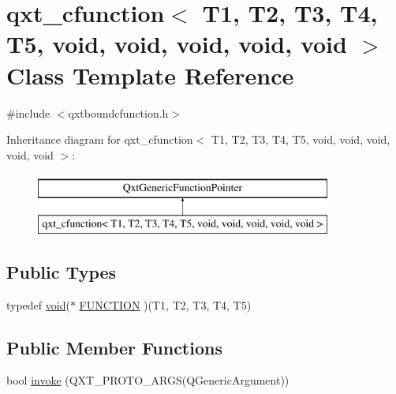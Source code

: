 \hypertarget{classqxt__cfunction_3_01_t1_00_01_t2_00_01_t3_00_01_t4_00_01_t5_00_01void_00_01void_00_01void_00_01void_00_01void_01_4}{\section{qxt\-\_\-cfunction$<$ T1, T2, T3, T4, T5, void, void, void, void, void $>$ Class Template Reference}
\label{classqxt__cfunction_3_01_t1_00_01_t2_00_01_t3_00_01_t4_00_01_t5_00_01void_00_01void_00_01void_00_01void_00_01void_01_4}
}


{\ttfamily \#include $<$qxtboundcfunction.\-h$>$}

Inheritance diagram for qxt\-\_\-cfunction$<$ T1, T2, T3, T4, T5, void, void, void, void, void $>$\-:\begin{figure}[H]
\begin{center}
\leavevmode
\includegraphics[height=2.000000cm]{classqxt__cfunction_3_01_t1_00_01_t2_00_01_t3_00_01_t4_00_01_t5_00_01void_00_01void_00_01void_00_01void_00_01void_01_4}
\end{center}
\end{figure}
\subsection*{Public Types}
\begin{DoxyCompactItemize}
\item 
typedef \hyperlink{group___u_a_v_objects_plugin_ga444cf2ff3f0ecbe028adce838d373f5c}{void}($\ast$ \hyperlink{classqxt__cfunction_3_01_t1_00_01_t2_00_01_t3_00_01_t4_00_01_t5_00_01void_00_01void_00_01void_00_01void_00_01void_01_4_a0317226a55c43e0ac87aba638eea3df0}{F\-U\-N\-C\-T\-I\-O\-N} )(T1, T2, T3, T4, T5)
\end{DoxyCompactItemize}
\subsection*{Public Member Functions}
\begin{DoxyCompactItemize}
\item 
bool \hyperlink{classqxt__cfunction_3_01_t1_00_01_t2_00_01_t3_00_01_t4_00_01_t5_00_01void_00_01void_00_01void_00_01void_00_01void_01_4_a97e2b1307d58f5ef7b95d20bb4709c15}{invoke} (Q\-X\-T\-\_\-\-P\-R\-O\-T\-O\-\_\-A\-R\-G\-S(Q\-Generic\-Argument))
\end{DoxyCompactItemize}
